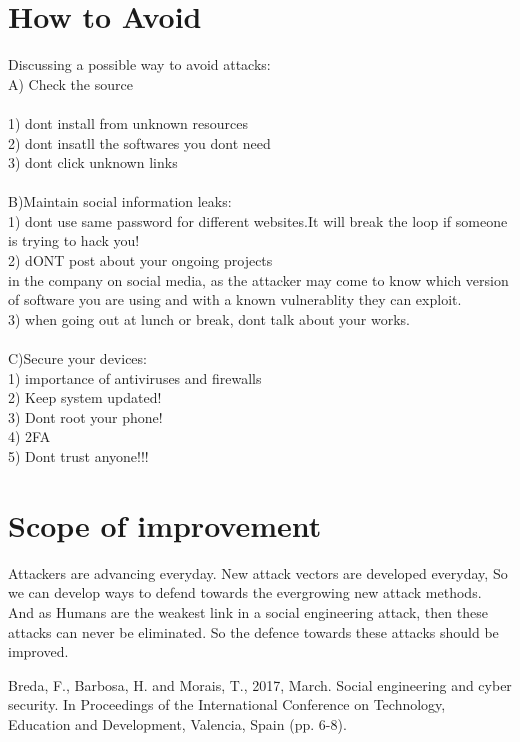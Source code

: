 \documentclass[a4paper,12pt]{article}
\begin{document}
\section{How to Avoid}

Discussing a possible way to avoid attacks:\\
A) Check the source\\\\ 1) dont install from unknown resources\\
2) dont insatll the softwares you dont need\\
3) dont click unknown links\\\\
B)Maintain social information leaks:\\
1) dont use same password for different
websites.It will break the loop if someone
is trying to hack you!\\
2) dONT post about your ongoing projects\\
in the company on social media, as the
attacker may come to know which version
of software you are using and with a known
vulnerablity they can exploit.\\
3) when going out at lunch or break, dont
talk about your works.\\\\
C)Secure your devices:\\
1) importance of antiviruses and firewalls\\
2) Keep system updated!\\
3) Dont root your phone!\\
4) 2FA\\
5) Dont trust anyone!!!\\





\section{Scope of improvement}
Attackers are advancing everyday. New attack vectors are developed everyday, So we can develop ways to defend towards the evergrowing new attack methods. And as Humans are the weakest link in a social engineering attack, then these attacks can never be eliminated. So the defence towards these attacks should be improved.


\begin{thebibliography}{widest entry}
	 Breda, F., Barbosa, H. and
Morais, T., 2017, March.
Social engineering and cyber security. In Proceedings
of the International Conference on Technology, Education and Development, Valencia, Spain (pp. 6-8).
	

\end{thebibliography}
\end{document}

